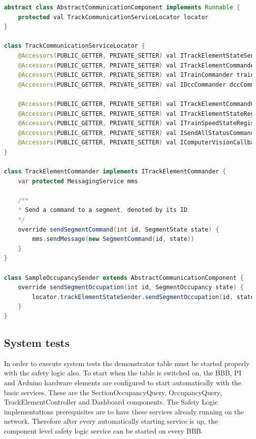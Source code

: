 \begin{lstlisting}[language = Java]
abstract class AbstractCommunicationComponent implements Runnable {
	protected val TrackCommunicationServiceLocator locator
}

class TrackCommunicationServiceLocator {
	@Accessors(PUBLIC_GETTER, PRIVATE_SETTER) val ITrackElementStateSender trackElementStateSender
	@Accessors(PUBLIC_GETTER, PRIVATE_SETTER) val ITrackElementCommander trackElementCommander
	@Accessors(PUBLIC_GETTER, PRIVATE_SETTER) val ITrainCommander trainCommander
	@Accessors(PUBLIC_GETTER, PRIVATE_SETTER) val IDccCommander dccCommander
	
	@Accessors(PUBLIC_GETTER, PRIVATE_SETTER) val ITrackElementCommandCallback trackElementCommandCallback
	@Accessors(PUBLIC_GETTER, PRIVATE_SETTER) val ITrackElementStateRegistry trackElementStateRegistry
	@Accessors(PUBLIC_GETTER, PRIVATE_SETTER) val ITrainSpeedStateRegistry trainSpeedStateRegistry
	@Accessors(PUBLIC_GETTER, PRIVATE_SETTER) val ISendAllStatusCommandCallback sendAllStatusCallback
	@Accessors(PUBLIC_GETTER, PRIVATE_SETTER) val IComputerVisionCallback computerVisionCallback
}

class TrackElementCommander implements ITrackElementCommander {
	var protected MessagingService mms
	
	/**
	* Send a command to a segment, denoted by its ID.
	*/
	override sendSegmentCommand(int id, SegmentState state) {
		mms.sendMessage(new SegmentCommand(id, state))
	}
}

class SampleOccupancySender extends AbstractCommunicationComponent {
	override sendSegmentOccupation(int id, SegmentOccupancy state) {
		locator.trackElementStateSender.sendSegmentOccupation(id, state)
	}
}
\end{lstlisting}

\subsection{System tests}
In order to execute system tests the demonstrator table must be started properly with the safety logic also. To start when the table is switched on, the BBB, PI and Arduino hardware elements are configured to start automatically with the basic services. These are the SectionOccupancyQuery, OccupancyQuery, TrackElementController and Dashboard components. The Safety Logic implementations prerequisites are to have these services already running on the network. Therefore after every automatically starting service is up, the component level safety logic service can be started on every BBB.

